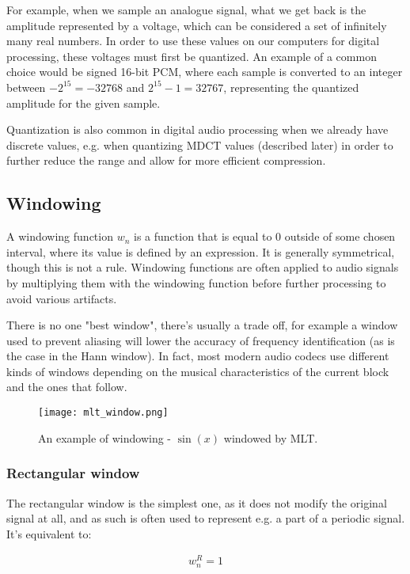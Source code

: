 For example, when we sample an analogue signal, what we get back is the amplitude represented by a voltage, which can be considered a set of infinitely many real numbers. In order to use these values on our computers for digital processing, these voltages must first be quantized. \cite{bosi_goldberg_2003} An example of a common choice would be signed 16-bit PCM, where each sample is converted to an integer between $-2^{15} = -32768$ and $2^{15}-1 = 32767$, representing the quantized amplitude for the given sample.

Quantization is also common in digital audio processing when we already have discrete values, e.g. when quantizing MDCT values (described later) in order to further reduce the range and allow for more efficient compression.

\subsection{Windowing}
A windowing function $w_n$ is a function that is equal to $0$ outside of some chosen interval, where its value is defined by an expression. It is generally symmetrical, though this is not a rule. Windowing functions are often applied to audio signals by multiplying them with the windowing function before further processing to avoid various artifacts.

There is no one "best window", there's usually a trade off, for example a window used to prevent aliasing will lower the accuracy of frequency identification (as is the case in the Hann window). \cite{bosi_goldberg_2003} In fact, most modern audio codecs use different kinds of windows depending on the musical characteristics of the current block and the ones that follow. \cite{Raissi2002TheTB}

\begin{figure}[ht]
	\caption[Windowing example]{An example of windowing - $\sin(x)$ windowed by MLT.}
	\centering
	\texttt{[image: mlt\_window.png]}
\end{figure}

\subsubsection{Rectangular window}
The rectangular window is the simplest one, as it does not modify the original signal at all, and as such is often used to represent e.g. a part of a periodic signal. It's equivalent to:

\begin{align}
w_n^R = 1
\end{align}

